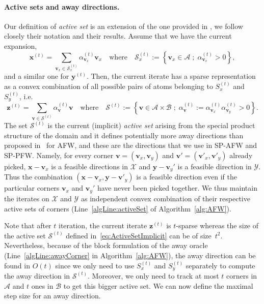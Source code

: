 \documentclass[twoside]{article}
\newcommand{\X}{\mathcal{X}}
\newcommand{\Y}{\mathcal{Y}}
\newcommand{\x}{\bm{x}}
\newcommand{\y}{\bm{y}}
\newcommand{\xt}{\bm{x}^{(t)}}
\newcommand{\zt}{\bm{z}^{(t)}}
\newcommand{\yt}{\bm{y}^{(t)}}
\newcommand{\vv}{\bm{v}} %
\newcommand{\A}{\mathcal{A}}
\newcommand{\B}{\mathcal{B}}
\newcommand{\Vertices}{\mathcal{A}\times \mathcal{B}} %
\newcommand{\0}{\mathbf{0}} %
\begin{document}
  \paragraph{Active sets and away directions.} %
  \label{par:active_set}
   Our definition of \emph{active set} is an extension of the one provided in \citet{lacoste2015global}, we follow closely their notation and their results. Assume that we have the current expansion,
  \begin{equation}
    \xt = \sum_{\vv_x \in \mathcal S_x^{(t)}} \alpha_{\vv_x}^{(t)} \vv_x
    \quad \text{where} \quad
     \mathcal S_x^{(t)} := \left\{ \vv_x \in \A\;;\; \alpha_{\vv_x}^{(t)} >0 \right\},
  \end{equation}
  and a similar one for $\yt$.
   Then, the current iterate has a sparse representation as a convex combination of all possible pairs of atoms belonging to $S_x^{(t)}$ and $S_y^{(t)}$, i.e. 
   \begin{equation} \label{eq:ActiveSetImplicit}
     \zt = \sum_{\vv \in \mathcal S^{(t)}} \alpha_{\vv}^{(t)} \vv
     \quad \text{where} \quad
     \mathcal S^{(t)} := \left\{ \vv \in \Vertices\;;\; \alpha_{\vv}^{(t)}:= \alpha_{\vv_x}^{(t)}\alpha_{\vv_y}^{(t)} > 0\right\}.
   \end{equation}
  The set $\mathcal S^{(t)}$ is the current (implicit) \emph{active set} arising from the special product structure of the domain and it defines potentially more away directions than proposed in~\citep{lacoste2015global} for AFW, and these are the directions that we use in SP-AFW and SP-PFW.
  Namely, for every corner $\vv=(\vv_x,\vv_y)$ and $\vv' = (\vv'_x,\vv'_y)$ already picked, $\x-\vv_x$ is a feasible directions in $\X$ and $\y-\vv_y'$ is a feasible direction in $\Y$.
  Thus the combination $(\x-\vv_x,\y-\vv'_y)$ is a feasible direction even if the particular corners $\vv_x$ and $\vv_y'$ have never been picked together. We thus maintain the iterates on $\X$ and $\Y$ as independent convex combination of their respective active sets of corners (Line~\ref{algLine:activeSet} of Algorithm~\ref{alg:AFW}).
  
  Note that after $t$ iteration, the current iterate $\zt$ is $t$-sparse whereas the size of the active set $\mathcal S^{(t)}$ defined in~\eqref{eq:ActiveSetImplicit} can be of size~$t^2$. Nevertheless, because of the block formulation of the away oracle (Line~\ref{algLine:awayCorner} in Algorithm~\ref{alg:AFW}), the away direction can be found in $O(t)$ since we only need to use $S_x^{(t)}$ and $S_y^{(t)}$ separately to compute the away direction in $\mathcal S^{(t)}$.  %
  Moreover, we only need to track at most $t$ corners in $\A$ and $t$ ones in $\B$ to get this bigger active set.
  We can now define the maximal step size for an away direction.
\end{document}
